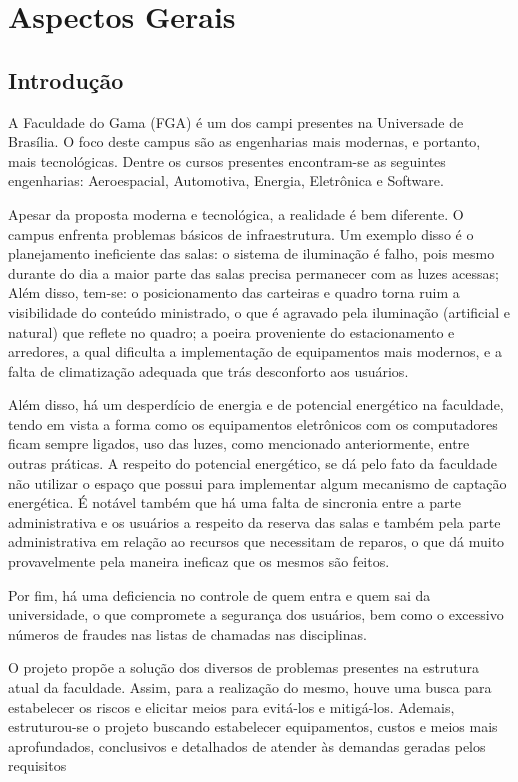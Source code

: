 \part{Aspectos Gerais}
\chapter[Introdução]{Introdução}

A Faculdade do Gama (FGA) é um dos campi presentes na Universade de Brasília. O
foco deste campus são as engenharias mais modernas, e portanto, mais
tecnológicas. Dentre os cursos presentes encontram-se as seguintes engenharias:
Aeroespacial, Automotiva, Energia, Eletrônica e Software.

Apesar da proposta moderna e tecnológica, a realidade é bem diferente. O campus
enfrenta problemas básicos de infraestrutura. Um exemplo disso é o planejamento
ineficiente das salas: o sistema de iluminação é falho, pois mesmo durante do
dia a maior parte das salas precisa permanecer com as luzes acessas; Além disso, tem-se: o
posicionamento das carteiras e quadro torna ruim a visibilidade do conteúdo
ministrado, o que é agravado pela iluminação (artificial e natural) que reflete
no quadro; a poeira proveniente do estacionamento e arredores, a qual dificulta
a implementação de equipamentos mais modernos, e a falta de climatização
adequada que trás desconforto aos usuários.

Além disso, há um desperdício de energia e de potencial energético na faculdade,
tendo em vista a forma como os equipamentos eletrônicos com os computadores
ficam sempre ligados, uso das luzes, como mencionado anteriormente, entre outras
práticas. A respeito do potencial energético, se dá pelo fato da faculdade não
utilizar o espaço que possui para implementar algum mecanismo de captação
energética. É notável também que há uma falta de sincronia entre a parte
administrativa e os usuários a respeito da reserva das salas e também pela parte
administrativa em relação ao recursos que necessitam de reparos, o que dá muito
provavelmente pela maneira ineficaz que os mesmos são feitos.

Por fim, há uma deficiencia no controle de quem entra e quem sai da
universidade, o que compromete a segurança dos usuários, bem como o excessivo
números de fraudes nas listas de chamadas nas disciplinas.

 O projeto propõe a solução dos diversos de problemas presentes
 na estrutura atual da faculdade. Assim, para a realização do mesmo, houve uma
 busca para estabelecer os riscos e elicitar meios para evitá-los e mitigá-los.
 Ademais, estruturou-se o projeto buscando estabelecer equipamentos, custos e
 meios mais aprofundados, conclusivos e detalhados de atender às demandas
 geradas pelos requisitos

